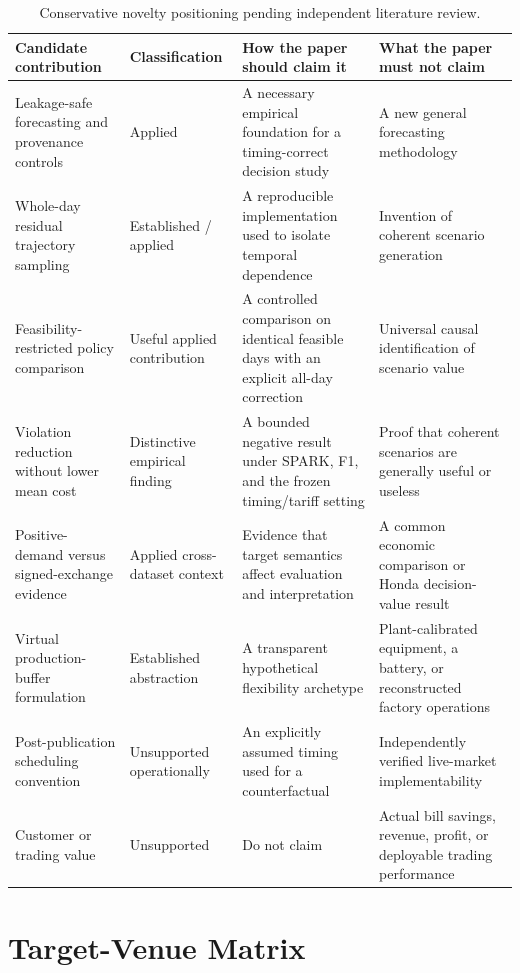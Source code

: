 \documentclass[10pt,twocolumn]{article}
\begin{document}
\begin{table}[h]
\centering
\caption{Conservative novelty positioning pending independent literature review.}
\small
\begin{tabularx}{\textwidth}{p{}p{}XX}
\toprule
Candidate contribution & Classification & How the paper should claim it & What the paper must not claim\\
\midrule
Leakage-safe forecasting and provenance controls & Applied & A necessary empirical foundation for a timing-correct decision study & A new general forecasting methodology\\
Whole-day residual trajectory sampling & Established / applied & A reproducible implementation used to isolate temporal dependence & Invention of coherent scenario generation\\
Feasibility-restricted policy comparison & Useful applied contribution & A controlled comparison on identical feasible days with an explicit all-day correction & Universal causal identification of scenario value\\
Violation reduction without lower mean cost & Distinctive empirical finding & A bounded negative result under SPARK, F1, and the frozen timing/tariff setting & Proof that coherent scenarios are generally useful or useless\\
Positive-demand versus signed-exchange evidence & Applied cross-dataset context & Evidence that target semantics affect evaluation and interpretation & A common economic comparison or Honda decision-value result\\
Virtual production-buffer formulation & Established abstraction & A transparent hypothetical flexibility archetype & Plant-calibrated equipment, a battery, or reconstructed factory operations\\
Post-publication scheduling convention & Unsupported operationally & An explicitly assumed timing used for a counterfactual & Independently verified live-market implementability\\
Customer or trading value & Unsupported & Do not claim & Actual bill savings, revenue, profit, or deployable trading performance\\
\bottomrule
\end{tabularx}
\end{table}

\section{Target-Venue Matrix}
\label{app:venues}
\end{document}
